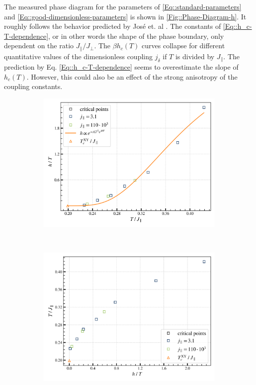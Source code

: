 	The measured phase diagram for the parameters of \eqref{Eq::standard-parameters} and \eqref{Eq::good-dimensionless-parameters} is shown in \autoref{Fig::Phase-Diagram-h}. It roughly follows the behavior predicted by José et. al \cite{jose1977renormalization}. The constants of \eqref{Eq::h_c-T-dependence}, or in other words the shape of the phase boundary, only dependent on the ratio $J_\parallel /	J_\perp$. The $\beta h_c(T)$ curves collapse for different quantitative values of the dimensionless coupling $j_\delta$ if $T$ is divided by $J_\parallel$. The prediction by Eq. \eqref{Eq::h_c-T-dependence} seems to overestimate the slope of $h_c(T)$. However, this could also be an effect of the strong anisotropy of the coupling constants.	
	\begin{figure}[htp]
		\begin{subfigure}{0.9\textwidth}
			\centering
			\includegraphics[width=0.9\linewidth]{graphics/phase_transition-h(T).png}
		\end{subfigure} \\
		\begin{subfigure}{0.9\textwidth}
			\centering
			\includegraphics[width=0.92\linewidth]{graphics/phase_transition-T(h).png}

\end{subfigure}
\end{figure}
